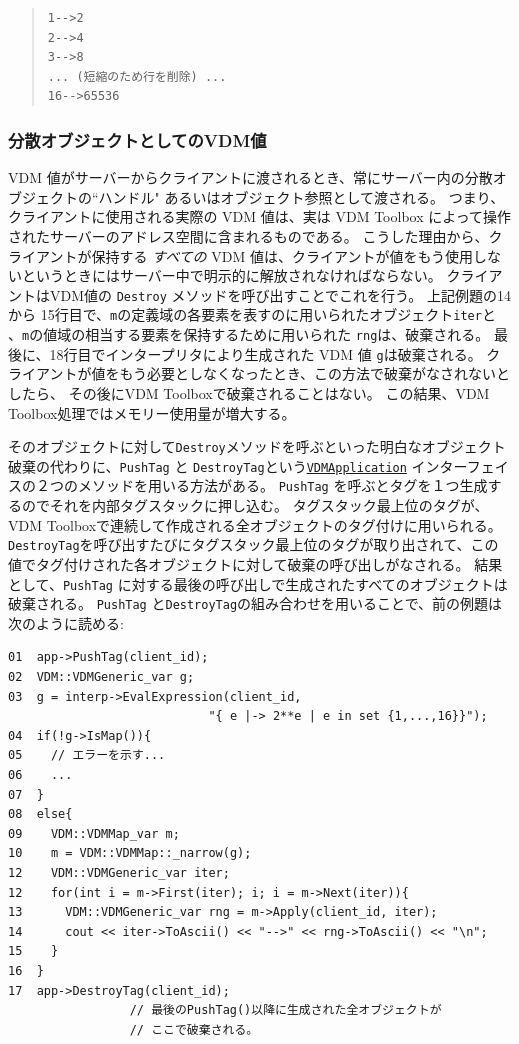 \documentclass[\pformat,12pt]{jarticle}
\newcommand{\VDMApplication}{\hyperlink{interface.VDMApplication}{VDMApplication}}
\begin{document}
\begin{quote}
\begin{verbatim}    
1-->2 
2-->4 
3-->8 
... (短縮のため行を削除) ...  
16-->65536
\end{verbatim}
\end{quote}

\subsubsection{分散オブジェクトとしてのVDM値}

VDM 値がサーバーからクライアントに渡されるとき、常にサーバー内の分散オブジェクトの``ハンドル" あるいはオブジェクト参照として渡される。
つまり、クライアントに使用される実際の VDM 値は、実は VDM Toolbox によって操作されたサーバーのアドレス空間に含まれるものである。
こうした理由から、クライアントが保持する {\em すべての} VDM 値は、クライアントが値をもう使用しないというときにはサーバー中で明示的に解放されなければならない。
クライアントはVDM値の {\tt Destroy} メソッドを呼び出すことでこれを行う。
 上記例題の14から 15行目で、{\tt m}の定義域の各要素を表すのに用いられたオブジェクト{\tt iter}と 、{\tt m}の値域の相当する要素を保持するために用いられた {\tt rng}は、破棄される。
最後に、18行目でインタープリタにより生成された VDM 値 {\tt g}は破棄される。
クライアントが値をもう必要としなくなったとき、この方法で破棄がなされないとしたら、 その後にVDM Toolboxで破棄されることはない。 
この結果、VDM Toolbox処理ではメモリー使用量が増大する。

そのオブジェクトに対して{\tt Destroy}メソッドを呼ぶといった明白なオブジェクト破棄の代わりに、{\tt PushTag} と {\tt  DestroyTag}という{\tt \VDMApplication} インターフェイスの２つのメソッドを用いる方法がある。
 {\tt PushTag} を呼ぶとタグを１つ生成するのでそれを内部タグスタックに押し込む。
タグスタック最上位のタグが、VDM Toolboxで連続して作成される全オブジェクトのタグ付けに用いられる。
 {\tt DestroyTag}を呼び出すたびにタグスタック最上位のタグが取り出されて、この値でタグ付けされた各オブジェクトに対して破棄の呼び出しがなされる。
結果として、{\tt PushTag} に対する最後の呼び出しで生成されたすべてのオブジェクトは破棄される。
 {\tt PushTag} と{\tt DestroyTag}の組み合わせを用いることで、前の例題は次のように読める:

\begin{verbatim}
01  app->PushTag(client_id);
02  VDM::VDMGeneric_var g;
03  g = interp->EvalExpression(client_id, 
                            "{ e |-> 2**e | e in set {1,...,16}}");
04  if(!g->IsMap()){
05    // エラーを示す...
06    ...
07  }
08  else{
09    VDM::VDMMap_var m;
10    m = VDM::VDMMap::_narrow(g);
12    VDM::VDMGeneric_var iter;
12    for(int i = m->First(iter); i; i = m->Next(iter)){
13      VDM::VDMGeneric_var rng = m->Apply(client_id, iter);
14      cout << iter->ToAscii() << "-->" << rng->ToAscii() << "\n"; 
15    }
16  }
17  app->DestroyTag(client_id); 
                 // 最後のPushTag()以降に生成された全オブジェクトが
                 // ここで破棄される。
\end{verbatim}
\end{document}
